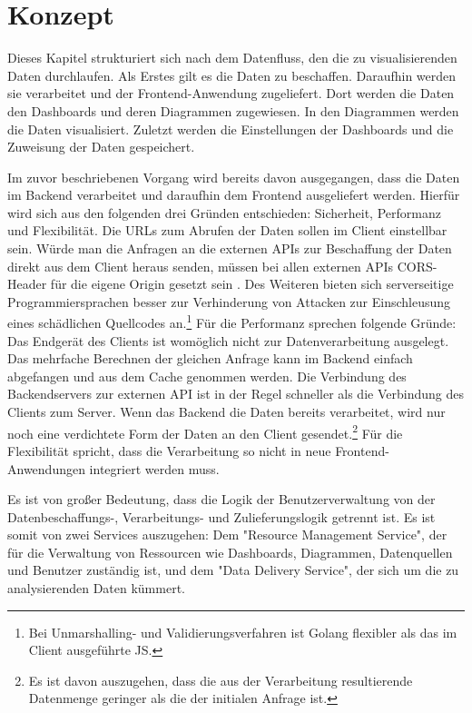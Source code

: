\chapter{Konzept}
\label{chap:konzept}
\setcounter{footnote}{0}
Dieses Kapitel strukturiert sich nach dem Datenfluss, den die
zu visualisierenden Daten durchlaufen. Als Erstes
gilt es die Daten zu beschaffen. Daraufhin werden sie verarbeitet und
der \foreignlanguage{english}{Frontend-Anwendung} zugeliefert. Dort werden die Daten den Dashboards
und deren Diagrammen zugewiesen. In den Diagrammen werden die Daten
visualisiert. Zuletzt werden die Einstellungen der Dashboards
und die Zuweisung der Daten gespeichert.

Im zuvor beschriebenen Vorgang wird bereits davon ausgegangen, dass die Daten im Backend
verarbeitet und daraufhin dem \foreignlanguage{english}{Frontend} ausgeliefert werden. Hierfür wird sich aus den
folgenden drei Gründen entschieden: Sicherheit, Performanz und Flexibilität. Die URLs
zum Abrufen der Daten sollen im Client einstellbar sein. Würde man die Anfragen an
die externen APIs zur Beschaffung der Daten direkt aus dem Client heraus senden,
müssen bei allen externen APIs CORS-Header für die eigene Origin gesetzt sein \cite{CORSW3C}.
Des Weiteren bieten sich serverseitige Programmiersprachen besser zur Verhinderung
von Attacken zur Einschleusung eines schädlichen Quellcodes an.\footnote{Bei
Unmarshalling- und Validierungsverfahren ist Golang flexibler als das im Client ausgeführte JS.}
Für die Performanz sprechen folgende Gründe: Das Endgerät des Clients ist womöglich
nicht zur Datenverarbeitung ausgelegt. Das mehrfache Berechnen der gleichen Anfrage
kann im Backend einfach abgefangen und aus dem Cache genommen werden. Die Verbindung
des \foreignlanguage{english}{Backendservers} zur externen API ist in der Regel schneller als die Verbindung
des Clients zum Server. Wenn das Backend die Daten bereits verarbeitet, wird nur noch
eine verdichtete Form der Daten an den Client gesendet.\footnote{Es ist davon auszugehen, dass
die aus der Verarbeitung resultierende Datenmenge geringer als die der initialen Anfrage ist.}
Für die Flexibilität spricht, dass die Verarbeitung so nicht in neue Frontend-Anwendungen
integriert werden muss.

Es ist von großer Bedeutung, dass die Logik der Benutzerverwaltung
von der Datenbeschaffungs-, Verarbeitungs- und Zulieferungslogik getrennt ist.
Es ist somit von zwei Services auszugehen: Dem "Resource Management Service",
der für die Verwaltung von Ressourcen wie Dashboards,
Diagrammen, Datenquellen und Benutzer zuständig ist, und dem "Data Delivery Service",
der sich um die zu analysierenden Daten kümmert.

